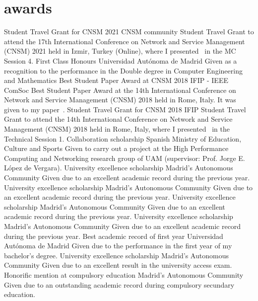 \documentclass[]{friggeri-cv}
\begin{document}
\section{awards}
\hspace{-5em}\vspace{-2.5em}
\begin{entrylist}
{Student Travel Grant for CNSM 2021}
{CNSM community}
{Student Travel Grant to attend the 17th International Conference on Network and Service Management (CNSM) 2021 held in Izmir, Turkey (Online), where I presented~\cite{cnsm2021} in the MC Session 4.}
{First Class Honours}
{Universidad Autónoma de Madrid}
{Given as a recognition to the performance in the Double degree in Computer Engineering and Mathematics}
{Best Student Paper Award at CNSM 2018}
{IFIP - IEEE ComSoc}
{Best Student Paper Award at the 14th International Conference on Network and Service Management (CNSM) 2018 held in Rome, Italy. It was given to my paper~\cite{cnsm2018}.}
{Student Travel Grant for CNSM 2018}
{IFIP}
{Student Travel Grant to attend the 14th International Conference on Network and Service Management (CNSM) 2018 held in Rome, Italy, where I presented~\cite{cnsm2018} in the Technical Session 1.}
{Collaboration scholarship}
{Spanish Ministry of Education, Culture and Sports}
{Given to carry out a project at the High Performance Computing and Networking research group of UAM (supervisor:  Prof. Jorge E. López de Vergara).}
{University excellence scholarship}
{Madrid's Autonomous Community }
{Given due to an excellent academic record during the previous year.}
{University excellence scholarship}
{Madrid's Autonomous Community }
{Given due to an excellent academic record during the previous year.}
{University excellence scholarship}
{Madrid's Autonomous Community }
{Given due to an excellent academic record during the previous year.}
{University excellence scholarship}
{Madrid's Autonomous Community }
{Given due to an excellent academic record during the previous year.}
{Best academic record of first year}
{Universidad Autónoma de Madrid }
{Given due to the performance in the first year of my bachelor's degree.}
{University excellence scholarship}
{Madrid's Autonomous Community }
{Given due to an excellent result in the university access exam.}
{Honorific mention at compulsory education}
{Madrid's Autonomous Community }
{Given due to an outstanding academic record during compulsory secundary education.}
\end{entrylist}
\end{document}
